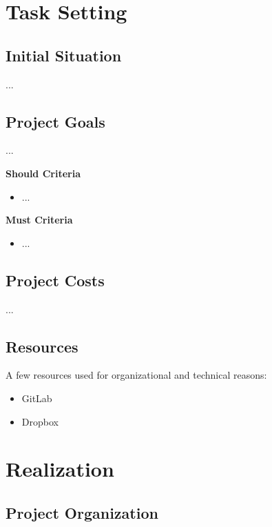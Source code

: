     \newpage

    \setcounter{page}{1}          %
    \section{Task Setting }
    
    \subsection{Initial Situation}
    ...
    
    \subsection{Project Goals}
    ...
    
    \vspace{.8cm}
	
	\textbf{Should Criteria}
	\begin{itemize}
	   \item ...
	\end{itemize}
     
     \textbf{Must Criteria}
     \begin{itemize}
     	\item ...
     \end{itemize}
     
	\subsection{Project Costs}
	...
	\subsection{Resources}
	A few resources used for organizational and technical reasons:
	\begin{itemize}
		\item GitLab
		\item Dropbox
	\end{itemize}
	
    \section{Realization}
	
    \subsection{Project Organization}
    
